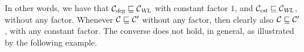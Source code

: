 In other words, we have that ${\cal C}_{\textsl{deg}}\sqsubseteq {\cal C}_{\textsl{WL}}$ with constant factor $1$, and ${\cal C}_{\textsl{cst}}\sqsubseteq {\cal C}_{\textsl{WL}}$, without any factor.
Whenever ${\cal C}\sqsubseteq {\cal C}'$ without any factor, then clearly
also ${\cal C}\sqsubseteq {\cal C}'$, with any constant factor. The converse does not hold, in general, as illustrated by the following example.
%
%



%
%
%

